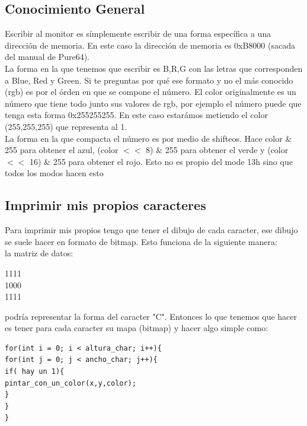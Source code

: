 \documentclass[]{article}
\begin{document}
\subsection*{Conocimiento General}

Escribir al monitor es s\'implemente escribir de una forma espec\'ifica a una direcci\'on de memoria. En este caso la direcci\'on de memoria es 0xB8000 (sacada del manual de Pure64).\\

La forma en la que tenemos que escribir es B,R,G con las letras que corresponden a Blue, Red y Green. Si te preguntas por qu\'e ese formato y no el m\'as conocido (rgb) es por el \'orden en que se compone el n\'umero. El color originalmente es un n\'umero que tiene todo junto sus valores de rgb, por ejemplo el n\'umero puede que tenga esta forma 0x255255255. En este caso estar\'amos metiendo el color (255,255,255) que representa al 1.\\

La forma en la que compacta el n\'umero es por medio de shifteos. Hace color \& 255 para obtener el azul, (color $<<$ 8) \& 255 para obtener el verde y (color $<<$ 16) \& 255 para obtener el rojo. Esto no es propio del mode 13h sino que todos los modos hacen esto

\subsection*{Imprimir mis propios caracteres}
Para imprimir mis propios tengo que tener el dibujo de cada caracter, ese dibujo se suele hacer en formato de bitmap. Esto funciona de la siguiente manera: \\

la matriz de datos:\\
\begin{center}
1111\\
1000\\
1111\\
\end{center}

podría representar la forma del caracter "C". Entonces lo que tenemos que hacer es tener para cada caracter su mapa (bitmap) y hacer algo simple como:

\begin{verbatim}
for(int i = 0; i < altura_char; i++){
for(int j = 0; j < ancho_char; j++){
if( hay un 1){
pintar_con_un_color(x,y,color);
}
}
}
\end{verbatim}
\end{document}
